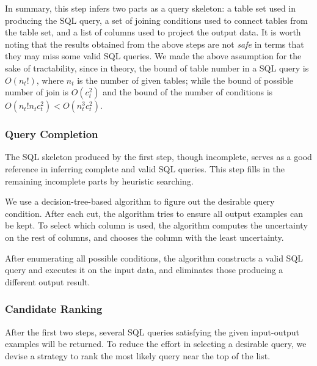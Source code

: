 In summary, this step infers two parts as a query skeleton: a table set used in producing the SQL query, a set of joining conditions
used to connect tables from the table set, and a list of columns used to project the output data.
It is worth noting that the results obtained from the above steps are not \textit{safe} in
terms that they may miss some valid SQL queries. We made the above assumption for the sake of tractability,
since in theory, the bound of table number in a SQL query is $O(n_t!)$, where $n_t$ is the number of given tables;
while the bound of possible number of join is $O(c_t^2)$ and the bound of the number of conditions is $O(n_t!n_tc_t^2)<O(n_t^3c_t^2)$.





\subsubsection{Query Completion}
\label{sec:completion}

The SQL skeleton produced by the first step, though incomplete, serves as a good reference in
inferring complete and valid SQL queries. This step fills in the
remaining incomplete parts by heuristic searching.

We use a decision-tree-based algorithm to figure out the desirable query condition.
After each cut, the algorithm tries to ensure all output examples can be kept. To select which column
is used, the algorithm computes the uncertainty on the rest of columns, and chooses the column with
the least uncertainty.

After enumerating all possible conditions, the algorithm constructs a valid SQL query
and executes it on the input data, and eliminates those producing a different output result.


\subsubsection{Candidate Ranking}
\label{sec:ranking}

After the first two steps, several SQL queries satisfying the given input-output examples
will be returned. To reduce the effort in selecting a desirable query, we devise a strategy
to rank the most likely query near the top of the list.

